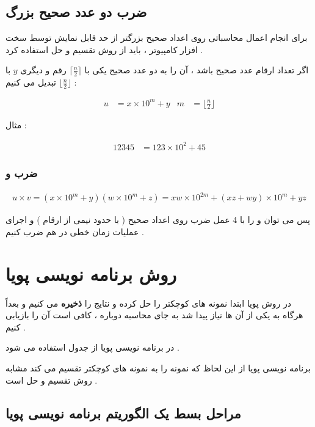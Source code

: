 \documentclass[12pt]{book}
\begin{document}
\section{ضرب دو عدد صحیح بزرگ}

برای انجام اعمال محاسباتی روی اعداد صحیح بزرگتر از حد قابل نمایش توسط سخت افزار کامپیوتر ، باید از روش تقسیم و حل استفاده کرد .

اگر 
تعداد ارقام عدد صحیح 
باشد ، آن را به دو عدد صحیح یکی
 با 
 $\lceil \frac{n}{2} \rceil$
رقم و دیگری 
$y$
با
 $\lfloor \frac{n}{2} \rfloor$
 تبدیل می کنیم :
 
\begin{align*}
u &= x \times 10^{m} + y  & m &= \lfloor \frac{n}{2} \rfloor
\end{align*}

مثال :

\begin{align*}
12345 &= 123 \times 10^{2} + 45
\end{align*}


\subsection{ضرب
و
}

\begin{align*}
u \times v = (x \times 10^{m} + y) (w \times 10^{m} + z) = xw \times 10^{2m} + (xz + wy) \times 10^{m} + yz
\end{align*}



پس می توان 
و
را با 4 عمل ضرب روی اعداد صحیح ( با حدود نیمی از ارقام ) و اجرای عملیات زمان خطی در هم ضرب کنیم .






\chapter{روش برنامه نویسی پویا}


در روش پویا ابتدا نمونه های کوچکتر را حل کرده و نتایج را 
\textbf{ذخیره} 
می کنیم و بعداً هرگاه به یکی از آن ها نیاز پیدا شد به جای محاسبه دوباره ، کافی است آن را بازیابی کنیم .

در برنامه نویسی پویا از جدول استفاده می شود .


برنامه نویسی پویا از این لحاظ که نمونه را به نمونه های کوچکتر تقسیم می کند مشابه روش تقسیم و حل است .



\section{مراحل بسط یک الگوریتم برنامه نویسی پویا}
\end{document}
